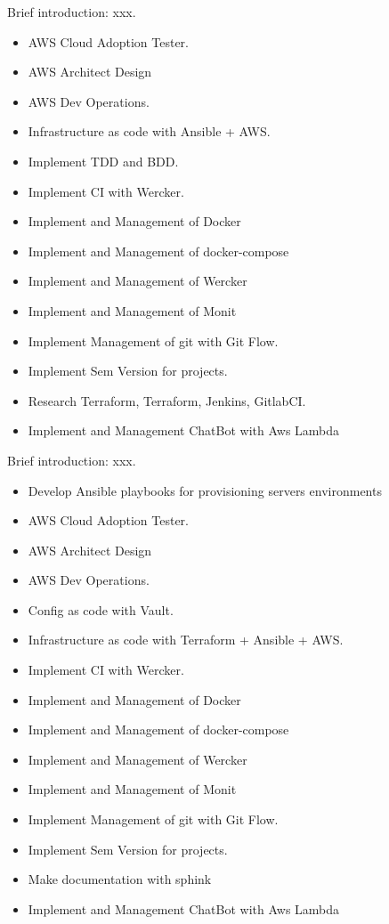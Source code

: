 \documentclass{resume}
\begin{document}
Brief introduction: xxx.
\begin{itemize}
  \item AWS Cloud Adoption Tester.
  \item AWS Architect Design
  \item AWS Dev Operations.
  \item Infrastructure as code with Ansible + AWS.
  \item Implement TDD and BDD.
  \item Implement CI with Wercker.
  \item Implement and Management of Docker
  \item Implement and Management of docker-compose
  \item Implement and Management of Wercker
  \item Implement and Management of Monit
  \item Implement Management of git with Git Flow.
  \item Implement Sem Version for projects.
  \item Research Terraform, Terraform, Jenkins, GitlabCI.
  \item Implement and Management ChatBot with Aws Lambda
\end{itemize}

Brief introduction: xxx.
\begin{itemize}
  \item Develop Ansible playbooks for provisioning servers environments
  \item AWS Cloud Adoption Tester.
  \item AWS Architect Design
  \item AWS Dev Operations.
  \item Config as code with Vault.
  \item Infrastructure as code with Terraform + Ansible + AWS.
  \item Implement CI with Wercker.
  \item Implement and Management of Docker
  \item Implement and Management of docker-compose
  \item Implement and Management of Wercker
  \item Implement and Management of Monit
  \item Implement Management of git with Git Flow.
  \item Implement Sem Version for projects.
  \item Make documentation with sphink
  \item Implement and Management ChatBot with Aws Lambda
\end{itemize}
\end{document}
